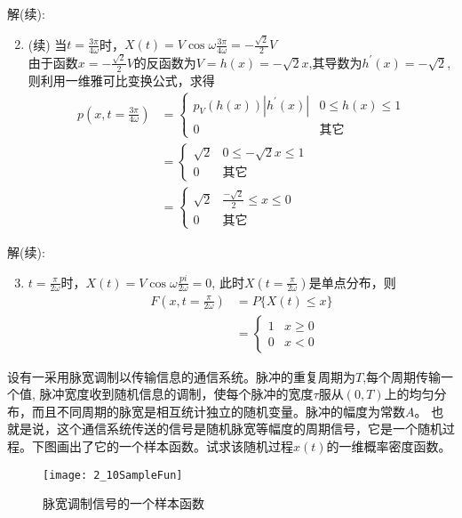 \begin{frame}
解(续):
\begin{enumerate}
	\setcounter{enumi}{1} %
	\item (续) 当$t=\frac{3\pi}{4\omega}$时，$X(t)=V\cos\omega\frac{3\pi}{4\omega}=-\frac{\sqrt{2}}{2}V$\\
	由于函数$x=-\frac{\sqrt{2}}{2}V$的反函数为$V=h(x)=-\sqrt{2}x$,其导数为$h^\prime(x)=-\sqrt{2}$,则利用一维雅可比变换公式，求得
	\begin{align*}
		p(x,t=\frac{3\pi}{4\omega}) &=\begin{cases}
		p_V(h(x))|h^\prime(x)| &0\le h(x)\le 1\\
		0 &\text{其它}
		\end{cases}\\
		&=\begin{cases}
		\sqrt{2} &0\le -\sqrt{2}x\le 1\\
		0 &\text{其它}
		\end{cases}\\
		&=\begin{cases}
		\sqrt{2} &\frac{-\sqrt{2}}{2}\le x\le 0\\
		0 &\text{其它}
		\end{cases}
	\end{align*}
\end{enumerate}
\end{frame}

\begin{frame}
解(续):
\begin{enumerate}
	\setcounter{enumi}{2} %
	\item $t=\frac{\pi}{2\omega}$时，$X(t)=V\cos\omega\frac{pi}{2\omega}=0$, 此时$X(t=\frac{\pi}{2\omega})$是单点分布，则
	\begin{align*}
	F(x,t=\frac{\pi}{2\omega}) &=P\{X(t)\le x \}\\
	&=\begin{cases}
	1 &x\ge 0\\
	0 &x<0
	\end{cases}
	\end{align*}
\end{enumerate}
\end{frame}

\begin{frame}
\begin{example}
设有一采用脉宽调制以传输信息的通信系统。脉冲的重复周期为$T$,每个周期传输一个值, 脉冲宽度收到随机信息的调制，使每个脉冲的宽度$\tau$服从$(0,T)$上的均匀分布，而且不同周期的脉宽是相互统计独立的随机变量。脉冲的幅度为常数$A$。 也就是说，这个通信系统传送的信号是随机脉宽等幅度的周期信号，它是一个随机过程。下图画出了它的一个样本函数。试求该随机过程$x(t)$的一维概率密度函数。
\begin{figure}
	\texttt{[image: 2\_10SampleFun]}
	\caption {脉宽调制信号的一个样本函数}
\end{figure}
\end{example}
\end{frame}

